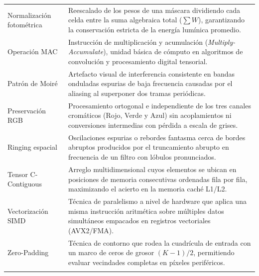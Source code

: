 \documentclass[11pt]{article}
\begin{document}
\begin{longtable}{>{\raggedright\arraybackslash}p{3.8cm}>{\raggedright\arraybackslash}p{10.4cm}}
Normalización fotométrica & Reescalado de los pesos de una máscara dividiendo cada celda entre la suma algebraica total ($\sum W$), garantizando la conservación estricta de la energía lumínica promedio. \\
\cellcolor{azulClaro!40}Operación MAC & \cellcolor{azulClaro!40}Instrucción de multiplicación y acumulación (\textit{Multiply-Accumulate}), unidad básica de cómputo en algoritmos de convolución y procesamiento digital tensorial. \\
Patrón de Moiré & Artefacto visual de interferencia consistente en bandas onduladas espurias de baja frecuencia causadas por el aliasing al superponer dos tramas periódicas. \\
\cellcolor{azulClaro!40}Preservación RGB & \cellcolor{azulClaro!40}Procesamiento ortogonal e independiente de los tres canales cromáticos (Rojo, Verde y Azul) sin acoplamientos ni conversiones intermedias con pérdida a escala de grises. \\
Ringing espacial & Oscilaciones espurias o rebordes fantasma cerca de bordes abruptos producidos por el truncamiento abrupto en frecuencia de un filtro con lóbulos pronunciados. \\
\cellcolor{azulClaro!40}Tensor C-Contiguous & \cellcolor{azulClaro!40}Arreglo multidimensional cuyos elementos se ubican en posiciones de memoria consecutivas ordenadas fila por fila, maximizando el acierto en la memoria caché L1/L2. \\
Vectorización SIMD & Técnica de paralelismo a nivel de hardware que aplica una misma instrucción aritmética sobre múltiples datos simultáneos empacados en registros vectoriales (AVX2/FMA). \\
\cellcolor{azulClaro!40}Zero-Padding & \cellcolor{azulClaro!40}Técnica de contorno que rodea la cuadrícula de entrada con un marco de ceros de grosor $(K-1)/2$, permitiendo evaluar vecindades completas en píxeles periféricos. \\
\bottomrule
\label{tab:glosario_terminologico}
\end{longtable}
\end{document}
